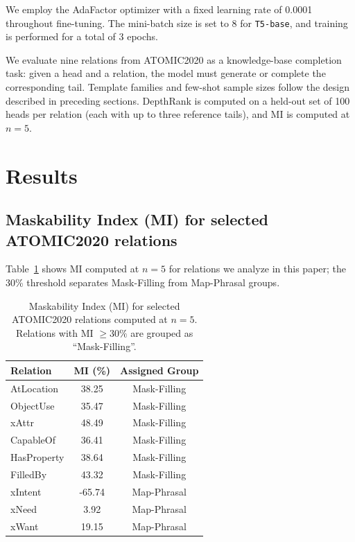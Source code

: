 \documentclass{i4c-en}
\begin{document}
We employ the AdaFactor optimizer with a fixed learning rate of 0.0001 throughout fine-tuning. The mini-batch size is set to 8 for \texttt{T5-base}, and training is performed for a total of 3 epochs.

We evaluate nine relations from ATOMIC2020 as a knowledge-base completion task: given a head and a relation, the model must generate or complete the corresponding tail. Template families and few-shot sample sizes follow the design described in preceding sections. DepthRank is computed on a held-out set of 100 heads per relation (each with up to three reference tails), and MI is computed at \(n=5\).

	\section{Results}
	
	\subsection{Maskability Index (MI) for selected ATOMIC2020 relations}
	Table~\ref{table:mi} shows MI computed at \(n=5\) for relations we analyze in this paper; the 30\% threshold separates Mask-Filling from Map-Phrasal groups.
	
	\begin{table}[ht]
		\centering
		\small
		\begin{tabular}{lcc}
			\toprule
			\textbf{Relation} & \textbf{MI (\%)} & \textbf{Assigned Group} \\
			\midrule
			AtLocation & 38.25 & Mask-Filling \\
			ObjectUse  & 35.47 & Mask-Filling \\
			xAttr      & 48.49 & Mask-Filling \\
						CapableOf      & 36.41 & Mask-Filling \\
									HasProperty      & 38.64 & Mask-Filling \\
												FilledBy      & 43.32 & Mask-Filling \\
			xIntent    & -65.74 & Map-Phrasal \\
			xNeed      & 3.92 & Map-Phrasal \\
			xWant      & 19.15 & Map-Phrasal \\
			\bottomrule
		\end{tabular}
		\caption{Maskability Index (MI) for selected ATOMIC2020 relations computed at \(n=5\). Relations with MI $\geq 30\%$ are grouped as ``Mask-Filling''.}
		\label{table:mi}
	\end{table}
	
\end{document}
